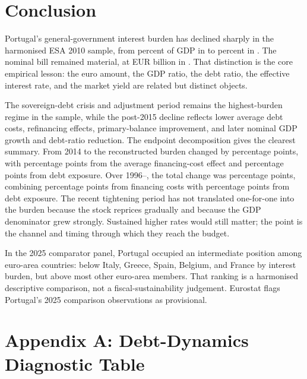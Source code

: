\documentclass[11pt,a4paper]{article}
\begin{document}
\section{Conclusion}

Portugal's general-government interest burden has declined sharply in the
harmonised ESA 2010 sample, from \InitialInterestPctGdp{} percent of GDP in
\MainStartYear{} to \LatestInterestPctGdp{} percent in \LatestYear{}. The
nominal bill remained material, at EUR \LatestInterestEurBn{} billion in
\LatestYear{}. That distinction is the core empirical lesson: the euro amount,
the GDP ratio, the debt ratio, the effective interest rate, and the market yield
are related but distinct objects.

The sovereign-debt crisis and adjustment period remains the highest-burden
regime in the sample, while the post-2015 decline reflects lower average debt
costs, refinancing effects, primary-balance improvement, and later nominal GDP
growth and debt-ratio reduction. The endpoint decomposition gives the clearest
summary. From 2014 to \LatestYear{} the reconstructed burden changed by
\DecompTotalTwentyFourteenToLatestPp{} percentage points, with
\DecompRateTwentyFourteenToLatestPp{} percentage points from the average
financing-cost effect and \DecompExposureTwentyFourteenToLatestPp{} percentage
points from debt exposure. Over 1996--\LatestYear{}, the total change was
\DecompTotalNineteenNinetySixToLatestPp{} percentage points, combining
\DecompRateNineteenNinetySixToLatestPp{} percentage points from financing costs
with \DecompExposureNineteenNinetySixToLatestPp{} percentage points from debt
exposure. The recent tightening period has not translated one-for-one into the
burden because the stock reprices gradually and because the GDP denominator
grew strongly. Sustained higher rates would still matter; the point is the
channel and timing through which they reach the budget.

In the 2025 comparator panel, Portugal occupied an intermediate position among
euro-area countries: below Italy, Greece, Spain, Belgium, and France by
interest burden, but above most other euro-area members. That ranking is a
harmonised descriptive comparison, not a fiscal-sustainability judgement.
Eurostat flags Portugal's 2025 comparison observations as provisional.

\newpage
\appendix

\section{Appendix A: Debt-Dynamics Diagnostic Table}
\end{document}
